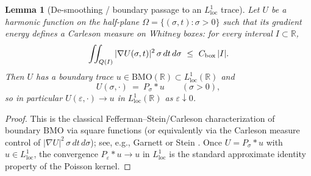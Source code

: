 \documentclass[11pt]{article}
\newtheorem{lemma}[theorem]{Lemma}
\theoremstyle{definition}
\theoremstyle{remark}
\theoremstyle{definition}
\newcommand{\R}{\mathbb{R}}
\begin{document}


\begin{lemma}[De-smoothing / boundary passage to an $L^1_{\mathrm{loc}}$ trace]\label{lem:desmooth-L1}
Let $U$ be a harmonic function on the half-plane $\Omega=\{(\sigma,t):\sigma>0\}$ such that its gradient energy defines a Carleson measure on Whitney boxes:
for every interval $I\subset\R$,
\[
  \iint_{Q(I)} |\nabla U(\sigma,t)|^2\,\sigma\,dt\,d\sigma\ \le\ C_{\rm box}\,|I|.
\]
Then $U$ has a boundary trace $u\in \mathrm{BMO}(\R)\subset L^1_{\mathrm{loc}}(\R)$ and
\[
  U(\sigma,\cdot)\ =\ P_\sigma * u\qquad(\sigma>0),
\]
so in particular $U(\varepsilon,\cdot)\to u$ in $L^1_{\mathrm{loc}}(\R)$ as $\varepsilon\downarrow 0$.
\end{lemma}
\begin{proof}
This is the classical Fefferman--Stein/Carleson characterization of boundary $\mathrm{BMO}$ via square functions (or equivalently via the Carleson measure control of $|\nabla U|^2\,\sigma\,dt\,d\sigma$); see, e.g., Garnett \cite[Ch.~IV]{Garnett} or Stein \cite[Ch.~II]{SteinHA}. Once $U=P_\sigma*u$ with $u\in L^1_{\mathrm{loc}}$, the convergence $P_\varepsilon*u\to u$ in $L^1_{\mathrm{loc}}$ is the standard approximate identity property of the Poisson kernel.
\end{proof}
\end{document}

